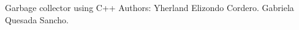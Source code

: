 \label{md_README_autotoc_md0}%
%
Garbage collector using C++ Authors\+: Yherland Elizondo Cordero. Gabriela Quesada Sancho. 